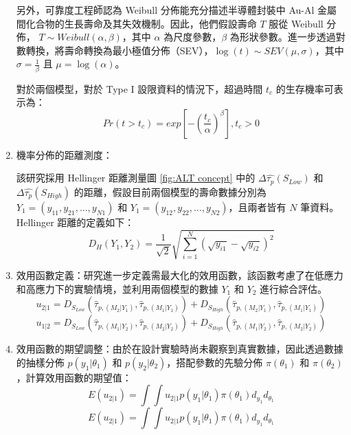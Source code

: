 \begin{enumerate}
另外，可靠度工程師認為 Weibull 分佈能充分描述半導體封裝中 Au-Al 金屬間化合物的生長壽命及其失效機制。因此，他們假設壽命 $T$ 服從 Weibull 分佈， $T\sim Weibull(\alpha,\beta)$，其中 $\alpha$ 為尺度參數，$\beta$ 為形狀參數。進一步透過對數轉換，將壽命轉換為最小極值分佈（SEV），$\log(t)\sim SEV(\mu,\sigma)$，其中 $\sigma=\frac{1}{\beta}$ 且 $\mu=\log(\alpha)$。

對於兩個模型，對於 Type I 設限資料的情況下，超過時間 $t_c$ 的生存機率可表示為：
\begin{equation} \label{censored}
Pr(t>t_c)=exp\left[-\left(\frac{t_c}{\alpha}\right)^\beta\right],t_c>0
\end{equation}

\item 機率分佈的距離測度：

該研究採用 Hellinger 距離測量圖 \ref{fig:ALT concept} 中的 $\Delta\hat{\tau_p}(S_{Low})$ 和 $\Delta\hat{\tau_p}(S_{High})$ 的距離，假設目前兩個模型的壽命數據分別為 $Y_1=(y_{11},y_{21}, \dots, y_{N1})$ 和 $Y_1=(y_{12},y_{22}, \dots, y_{N2})$，且兩者皆有 $N$ 筆資料。Hellinger 距離的定義如下：
\begin{equation}
D_H(Y_1,Y_2)=\frac{1}{\sqrt{2}}\sqrt{\sum_{i=1}^N(\sqrt{y_{i1}}-\sqrt{y_{i2}})^2}
\end{equation}

\item 效用函數定義：研究進一步定義需最大化的效用函數，該函數考慮了在低應力和高應力下的實驗情境，並利用兩個模型的數據 $Y_1$ 和 $Y_2$ 進行綜合評估。
\begin{equation}
u_{2|1}=D_{S_{Low}}(\hat{\tau}_{p,(M_2|Y_1)},\hat{\tau}_{p,(M_1|Y_1)}) +D_{S_{High}}(\hat{\tau}_{p,(M_2|Y_1)},\hat{\tau}_{p,(M_1|Y_1)})
\end{equation}
\begin{equation}
u_{1|2}=D_{S_{Low}}(\hat{\tau}_{p,(M_1|Y_2)},\hat{\tau}_{p,(M_2|Y_2)}) +D_{S_{High}}(\hat{\tau}_{p,(M_1|Y_2)},\hat{\tau}_{p,(M_2|Y_2)})
\end{equation}

\item 效用函數的期望調整：由於在設計實驗時尚未觀察到真實數據，因此透過數據的抽樣分佈 $p(y_1|\theta_1)$ 和 $p(y_2|\theta_2)$，搭配參數的先驗分佈 $\pi(\theta_1)$ 和 $\pi(\theta_2)$，計算效用函數的期望值：
\begin{equation}
E(u_{2|1})=\int\int u_{2|1}p(y_1|\theta_1)\pi(\theta_1)d_{y_1}d_{\theta_1}
\end{equation}
\begin{equation}
E(u_{2|1})=\int\int u_{2|1}p(y_1|\theta_1)\pi(\theta_1)d_{y_1}d_{\theta_1}
\end{equation}


\end{enumerate}
